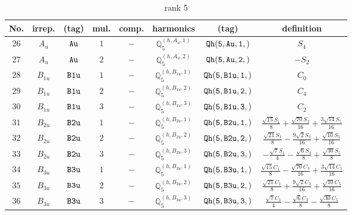 \documentclass[fleqn,8pt]{jsarticle}
\begin{document}
\begin{table}[ht!]
\begin{center}
\caption{rank 5}
\renewcommand{\arraystretch}{1.3}
\begin{tabular}{cccccccc} \hline \hline
No. & irrep. & (tag) & mul. & comp. & harmonics & (tag) & definition \\ \hline
$ 26 $ & $ A_{u} $ & $ {\tt Au} $ & $ 1 $ & $ - $ & $ \mathbb{Q}_{5}^{(h,A_{u},1)} $ & $ {\tt Qh(5,Au,1,)} $ & $ S_{4} $ \\
$ 27 $ & $ A_{u} $ & $ {\tt Au} $ & $ 2 $ & $ - $ & $ \mathbb{Q}_{5}^{(h,A_{u},2)} $ & $ {\tt Qh(5,Au,2,)} $ & $ - S_{2} $ \\
$ 28 $ & $ B_{1u} $ & $ {\tt B1u} $ & $ 1 $ & $ - $ & $ \mathbb{Q}_{5}^{(h,B_{1u},1)} $ & $ {\tt Qh(5,B1u,1,)} $ & $ C_{0} $ \\
$ 29 $ & $ B_{1u} $ & $ {\tt B1u} $ & $ 2 $ & $ - $ & $ \mathbb{Q}_{5}^{(h,B_{1u},2)} $ & $ {\tt Qh(5,B1u,2,)} $ & $ C_{4} $ \\
$ 30 $ & $ B_{1u} $ & $ {\tt B1u} $ & $ 3 $ & $ - $ & $ \mathbb{Q}_{5}^{(h,B_{1u},3)} $ & $ {\tt Qh(5,B1u,3,)} $ & $ C_{2} $ \\
$ 31 $ & $ B_{2u} $ & $ {\tt B2u} $ & $ 1 $ & $ - $ & $ \mathbb{Q}_{5}^{(h,B_{2u},1)} $ & $ {\tt Qh(5,B2u,1,)} $ & $ \frac{\sqrt{15} S_{1}}{8} + \frac{\sqrt{70} S_{3}}{16} + \frac{3 \sqrt{14} S_{5}}{16} $ \\
$ 32 $ & $ B_{2u} $ & $ {\tt B2u} $ & $ 2 $ & $ - $ & $ \mathbb{Q}_{5}^{(h,B_{2u},2)} $ & $ {\tt Qh(5,B2u,2,)} $ & $ \frac{\sqrt{21} S_{1}}{8} - \frac{9 \sqrt{2} S_{3}}{16} + \frac{\sqrt{10} S_{5}}{16} $ \\
$ 33 $ & $ B_{2u} $ & $ {\tt B2u} $ & $ 3 $ & $ - $ & $ \mathbb{Q}_{5}^{(h,B_{2u},3)} $ & $ {\tt Qh(5,B2u,3,)} $ & $ - \frac{\sqrt{7} S_{1}}{4} - \frac{\sqrt{6} S_{3}}{8} + \frac{\sqrt{30} S_{5}}{8} $ \\
$ 34 $ & $ B_{3u} $ & $ {\tt B3u} $ & $ 1 $ & $ - $ & $ \mathbb{Q}_{5}^{(h,B_{3u},1)} $ & $ {\tt Qh(5,B3u,1,)} $ & $ \frac{\sqrt{15} C_{1}}{8} - \frac{\sqrt{70} C_{3}}{16} + \frac{3 \sqrt{14} C_{5}}{16} $ \\
$ 35 $ & $ B_{3u} $ & $ {\tt B3u} $ & $ 2 $ & $ - $ & $ \mathbb{Q}_{5}^{(h,B_{3u},2)} $ & $ {\tt Qh(5,B3u,2,)} $ & $ \frac{\sqrt{21} C_{1}}{8} + \frac{9 \sqrt{2} C_{3}}{16} + \frac{\sqrt{10} C_{5}}{16} $ \\
$ 36 $ & $ B_{3u} $ & $ {\tt B3u} $ & $ 3 $ & $ - $ & $ \mathbb{Q}_{5}^{(h,B_{3u},3)} $ & $ {\tt Qh(5,B3u,3,)} $ & $ \frac{\sqrt{7} C_{1}}{4} - \frac{\sqrt{6} C_{3}}{8} - \frac{\sqrt{30} C_{5}}{8} $ \\
 \hline \hline
\end{tabular}
\end{center}
\end{table}
\end{document}
